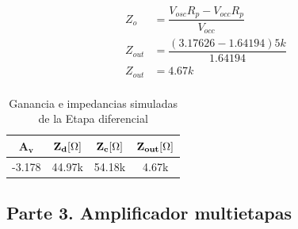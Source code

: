 \begin{enumerate}
        \begin{align*}
          Z_o     & = \dfrac{V_{osc}R_p - V_{occ}R_p}{V_{occ}} \\[0.2cm]
          Z_{out} & =\dfrac{(3.17626-1.64194)5k}{1.64194}      \\[0.2cm]
          Z_{out} & =4.67k                                     \\[0.2cm]
        \end{align*}

        \begin{table}[H]
          \centering
          \begin{tabular}{|c|c|c|c|}
            \hline
            $\mathbf{A_v}$ & $\mathbf{Z_{d}[\ohm]}$ & $\mathbf{Z_{c}[\ohm]}$ & $\mathbf{Z_{out} [\ohm]}$ \\ \hline
            -3.178         & 44.97k                 & 54.18k                 & 4.67k                     \\ \hline
          \end{tabular}
          \caption{Ganancia e impedancias simuladas de la Etapa diferencial}
          \label{tab:dinamico_ed_sim}
        \end{table}

\end{enumerate}

\subsection{Parte 3. Amplificador multietapas}

